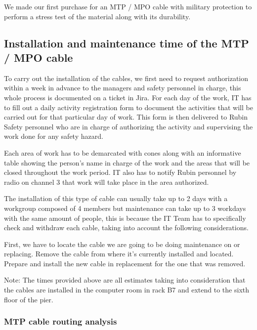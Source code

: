 We made our first purchase for an MTP / MPO cable with military protection to perform a stress test of the material along with its durability.

\subsection{Installation and maintenance time of the MTP / MPO cable}

To carry out the installation of the cables, we first need to request authorization within a week in advance to the managers and safety personnel in charge, this whole process is documented on a ticket in Jira. For each day of the work, IT has to fill out a daily activity registration form to document the activities that will be carried out for that particular day of work. This form is then delivered to Rubin Safety personnel who are in charge of authorizing the activity and supervising the work done for any safety hazard.

Each area of work has to be demarcated with cones along with an informative table showing the person's name in charge of the work and the areas that will be closed throughout the work period. IT also has to notify Rubin personnel by radio on channel 3 that work will take place in the area authorized.

The installation of this type of cable can usually take up to 2 days with a workgroup composed of 4 members but maintenance can take up to 3 workdays with the same amount of people, this is because the IT Team has to specifically check and withdraw each cable, taking into account the following considerations.

    First, we have to locate the cable we are going to be doing maintenance on or replacing.
    Remove the cable from where it's currently installed and located.
    Prepare and install the new cable in replacement for the one that was removed.


Note: The times provided above are all estimates taking into consideration that the cables are installed in the computer room in rack B7 and extend to the sixth floor of the pier.


\subsubsection{MTP cable routing analysis}

